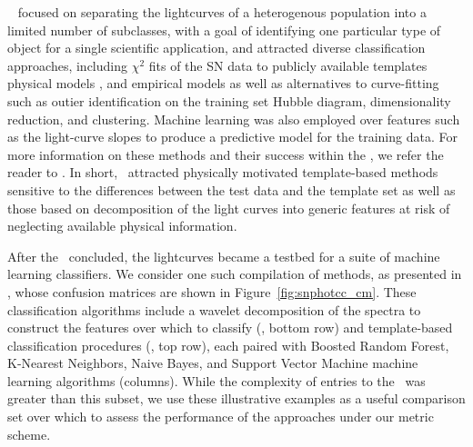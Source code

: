 \snphotcc\ \citep{kessler_supernova_2010} focused on separating the lightcurves of a heterogenous population into a limited number of subclasses, with a goal of identifying one particular type of object for a single scientific application, and attracted diverse classification approaches, including $\chi^{2}$ fits of the SN data to publicly available templates \citep{2002PASP..114..803N} physical models \citep{2008ApJ...681..482C}, and empirical models as well as alternatives to curve-fitting such as
outier identification on the training set Hubble diagram, dimensionality reduction,
and clustering.
Machine learning was also employed over features such as the light-curve slopes to produce a predictive model for the training data.
For more information on these methods and their success within the \snphotcc, we refer the reader to \cite{kessler_results_2010}.
In short, \snphotcc\ attracted physically motivated template-based methods sensitive to the differences between the test data and the template set
as well as those based on decomposition of the light curves into generic features at risk of neglecting available physical information.


After the \snphotcc\ concluded, the lightcurves became a testbed for a suite of machine learning classifiers.
We consider one such compilation of methods, as presented in \cite{lochner_photometric_2016}, whose confusion matrices are shown in Figure~\ref{fig:snphotcc_cm}.
These classification algorithms include a wavelet decomposition of the spectra to construct the features over which to classify (\citet{2011MNRAS.414.1987N}, bottom row) and template-based classification procedures (\citet{2011ApJ...738..162S}, top row), each paired with Boosted Random Forest, K-Nearest Neighbors, Naive Bayes, and Support Vector Machine machine learning algorithms (columns).
While the complexity of entries to the \snphotcc\ was greater than this subset, we use these illustrative examples as a useful comparison set over which to assess the performance of the approaches under our metric scheme.


